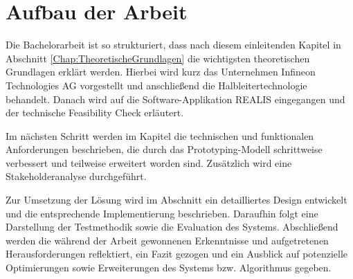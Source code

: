 \section{Aufbau der Arbeit}
Die Bachelorarbeit ist so strukturiert, dass nach diesem einleitenden Kapitel in Abschnitt \ref{Chap:TheoretischeGrundlagen} die wichtigsten theoretischen Grundlagen erklärt werden. 
Hierbei wird kurz das Unternehmen Infineon Technologies AG vorgestellt und anschließend die Halbleitertechnologie behandelt. Danach wird auf die Software-Applikation \gls{REALIS} eingegangen und der technische Feasibility Check erläutert.

Im nächsten Schritt werden im Kapitel \textit{} die technischen und funktionalen Anforderungen beschrieben, die durch das Prototyping-Modell schrittweise verbessert und teilweise erweitert worden sind. Zusätzlich wird eine Stakeholderanalyse durchgeführt.

Zur Umsetzung der Lösung wird im Abschnitt \textit{} ein detailliertes Design entwickelt und die entsprechende Implementierung beschrieben. Daraufhin folgt eine Darstellung der Testmethodik sowie die Evaluation des Systems. Abschließend werden die während der Arbeit gewonnenen Erkenntnisse und aufgetretenen Herausforderungen reflektiert, ein Fazit gezogen und ein Ausblick auf potenzielle Optimierungen sowie Erweiterungen des Systems bzw. Algorithmus gegeben.